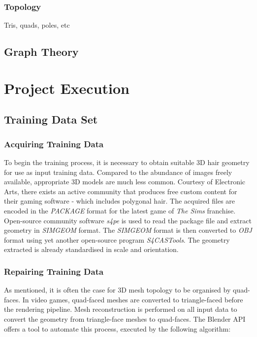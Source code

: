 \documentclass[ %
author={Dillon Keith Diep [INCOMPLETE DRAFT, NOT FOR SUBMISSION]},
supervisor={Dr. Carl Henrik Ek},
degree={MEng},
title={ARt-CG:},
subtitle={Assisted Real-time Content Generation of 3D Hair by Learning Manifolds},
type={Research},
year={2014} ]{dissertation}
\begin{document}
	\subsection{Topology}
	Tris, quads, poles, etc
	
	\section{Graph Theory}
	
	
	
	
	\chapter{Project Execution}
	\label{chap:execution}
	
	\section{Training Data Set}
	\subsection{Acquiring Training Data}
	To begin the training process, it is necessary to obtain suitable 3D hair geometry for use as input training data. Compared to the abundance of images freely available, appropriate 3D models are much less common. Courtesy of Electronic Arts, there exists an active community that produces free custom content for their gaming software - which includes polygonal hair. \cite{tsr} The acquired files are encoded in the \textit{PACKAGE} format for the latest game of \textit{The Sims} franchise. Open-source community software \textit{s4pe} is used to read the package file and extract geometry in \textit{SIMGEOM} format. \cite{s4pe} The \textit{SIMGEOM} format is then converted to \textit{OBJ} format using yet another open-source program \textit{S4CASTools}. \cite{s4cas} The geometry extracted is already standardised in scale and orientation.
	
	\subsection{Repairing Training Data}
	As mentioned, it is often the case for 3D mesh topology to be organised by quad-faces. In video games, quad-faced meshes are converted to triangle-faced before the rendering pipeline. Mesh reconstruction is performed on all input data to convert the geometry from triangle-face meshes to quad-faces. The Blender API offers a tool to automate this process, executed by the following algorithm:
	
\end{document}
